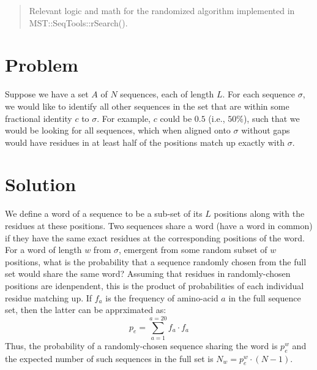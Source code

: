 \documentclass[12pt]{article}
\begin{document}
\maketitle

\begin{abstract}
Relevant logic and math for the randomized algorithm implemented in MST::SeqTools::rSearch().
\end{abstract}

\section{Problem}
Suppose we have a set $A$ of $N$ sequences, each of length $L$. For each sequence $\sigma$, we would like to identify all other sequences in the set that are within some fractional identity $c$ to $\sigma$. For example, $c$ could be $0.5$ (i.e., $50\%$), such that we would be looking for all sequences, which when aligned onto $\sigma$ without gaps would have residues in at least half of the positions match up exactly with $\sigma$.

\section{Solution}
We define a word of a sequence to be a sub-set of its $L$ positions along with the residues at these positions. Two sequences share a word (have a word in common) if they have the same exact residues at the corresponding positions of the word. For a word of length $w$ from $\sigma$, emergent from some random subset of $w$ positions, what is the probability that a sequence randomly chosen from the full set would share the same word? Assuming that residues in randomly-chosen positions are idenpendent, this is the product of probabilities of each individual residue matching up. If $f_a$ is the frequency of amino-acid $a$ in the full sequence set, then the latter can be apprximated as:
\begin{equation}
p_e = \sum_{a = 1}^{a = 20} f_a \cdot f_a
\end{equation}
Thus, the probability of a randomly-chosen sequence sharing the word is $p_e^w$ and the expected number of such sequences in the full set is $N_w = p_e^w \cdot (N-1)$.
\end{document}
